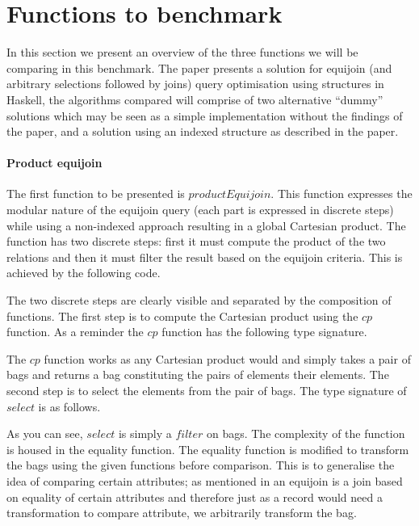 \section{Functions to benchmark}\label{sec:benchmark:functions}
In this section we present an overview of the three functions we will
be comparing in this benchmark. The paper \relalg{} presents a solution for
equijoin (and arbitrary selections followed by joins) query optimisation using
structures in Haskell, the algorithms compared will comprise of two alternative
``dummy'' solutions which may be seen as a simple implementation without the
findings of the paper, and a solution using an indexed structure as described
in the paper.

\paragraph{Product equijoin} The first function to be presented is
$productEquijoin$. This function
expresses the modular nature of the equijoin query (each part is expressed in
discrete steps) while using a non-indexed approach resulting in a global
Cartesian product.
The function has two discrete steps: first it must compute the product of the
two relations and then it must filter the result based on the equijoin criteria.
This is achieved by the following code.



\noindent
The two discrete steps are clearly visible and separated by the composition of
functions. The first step is to compute the Cartesian product using the
$cp$ function. As a reminder the $cp$ function has
the following type signature.


\noindent
The $cp$ function works as any Cartesian product would and simply takes a pair of bags and
returns a bag constituting the pairs of elements their elements.
The second step is to select the elements from the pair of
bags. The type signature of $select$ is as follows.


\noindent
As you can see, $select$ is simply a
$filter$ on bags. The complexity of the function is housed in the
equality function. The equality function is modified to transform the bags using
the given functions before comparison. This is to generalise the idea of
comparing certain attributes; as mentioned in  an
equijoin is a join based on equality of certain attributes and therefore just as
a record would need a transformation to compare attribute, we arbitrarily
transform the bag.

